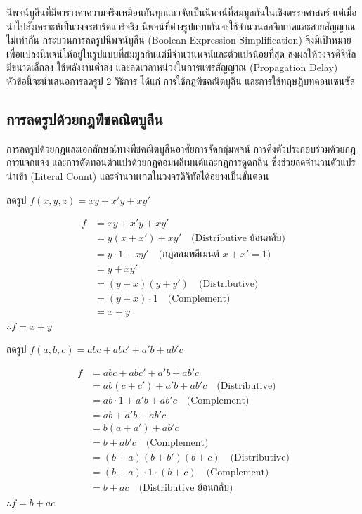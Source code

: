 นิพจน์บูลีนที่มีตารางค่าความจริงเหมือนกันทุกแถวจัดเป็นนิพจน์ที่สมมูลกันในเชิงตรรกศาสตร์ แต่เมื่อนำไปสังเคราะห์เป็นวงจรฮาร์ดแวร์จริง นิพจน์ที่ต่างรูปแบบกันจะใช้จำนวนลอจิกเกตและสายสัญญาณไม่เท่ากัน กระบวนการลดรูปนิพจน์บูลีน (Boolean Expression Simplification) จึงมีเป้าหมายเพื่อแปลงนิพจน์ให้อยู่ในรูปแบบที่สมมูลกันแต่มีจำนวนพจน์และตัวแปรน้อยที่สุด ส่งผลให้วงจรดิจิทัลมีขนาดเล็กลง ใช้พลังงานต่ำลง และลดเวลาหน่วงในการแพร่สัญญาณ (Propagation Delay) หัวข้อนี้จะนำเสนอการลดรูป 2 วิธีการ ได้แก่ การใช้กฎพีชคณิตบูลีน และการใช้ทฤษฎีบทคอนเซนซัส~\parencite{mano2018digital}

\subsection{การลดรูปด้วยกฎพีชคณิตบูลีน}
การลดรูปด้วยกฎและเอกลักษณ์ทางพีชคณิตบูลีนอาศัยการจัดกลุ่มพจน์ การดึงตัวประกอบร่วมด้วยกฎการแจกแจง และการตัดทอนตัวแปรด้วยกฎคอมพลีเมนต์และกฎการดูดกลืน ซึ่งช่วยลดจำนวนตัวแปรนำเข้า (Literal Count) และจำนวนเกตในวงจรดิจิทัลได้อย่างเป็นขั้นตอน~\parencite{mano2018digital}

\begin{ex}
\label{ex:simplify-basic}
ลดรูป $f(x, y, z) = x y + x' y + x y'$
\end{ex}
\begin{solution}
\begin{align*}
f &= x y + x' y + x y' \\
  &= y(x + x') + x y' \quad \text{(Distributive ย้อนกลับ)} \\
  &= y \cdot 1 + x y' \quad \text{(กฎคอมพลีเมนต์ } x + x' = 1) \\
  &= y + x y' \\
  &= (y + x)(y + y') \quad \text{(Distributive)} \\
  &= (y + x) \cdot 1 \quad \text{(Complement)} \\
  &= x + y
\end{align*}
$\therefore f = x + y$ \solhere
\end{solution}

\begin{ex}
\label{ex:simplify-3var}
ลดรูป $f(a, b, c) = a b c + a b c' + a' b + a b' c$
\end{ex}
\begin{solution}
\begin{align*}
f &= a b c + a b c' + a' b + a b' c \\
  &= a b(c + c') + a' b + a b' c \quad \text{(Distributive)} \\
  &= a b \cdot 1 + a' b + a b' c \quad \text{(Complement)} \\
  &= a b + a' b + a b' c \\
  &= b(a + a') + a b' c \\
  &= b + a b' c \quad \text{(Complement)} \\
  &= (b + a)(b + b')(b + c) \quad \text{(Distributive)} \\
  &= (b + a) \cdot 1 \cdot (b + c) \quad \text{(Complement)} \\
  &= b + a c \quad \text{(Distributive ย้อนกลับ)}
\end{align*}
$\therefore f = b + a c$ \solhere
\end{solution}

